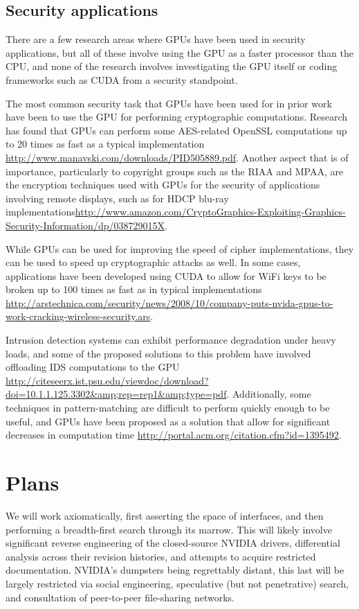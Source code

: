\documentclass[letterpaper,10pt]{article}
\begin{document}
\subsection{Security applications}
  There are a few research areas where GPUs have been used in security applications, but all of these involve using the GPU as a faster processor than the CPU, and none of the research involves investigating the GPU itself or coding frameworks such as CUDA from a security standpoint.
  
  The most common security task that GPUs have been used for in prior work have been to use the GPU for performing cryptographic computations. Research has found that GPUs can perform some AES-related OpenSSL computations up to 20 times as fast as a typical implementation
\url{http://www.manavski.com/downloads/PID505889.pdf}. Another aspect that is of importance, particularly to copyright groups such as the RIAA and MPAA, are the encryption techniques used with GPUs for the security of applications involving remote displays, such as for HDCP blu-ray implementations\url{http://www.amazon.com/CryptoGraphics-Exploiting-Graphics-Security-Information/dp/038729015X}.
  
  While GPUs can be used for improving the speed of cipher implementations, they can be used to speed up cryptographic attacks as well. In some cases, applications have been developed using CUDA to allow for WiFi keys to be broken up to 100 times as fast as in typical implementations \url{http://arstechnica.com/security/news/2008/10/company-puts-nvida-gpus-to-work-cracking-wireless-security.ars}.
  
  Intrusion detection systems can exhibit performance degradation under heavy
  loads, and some of the proposed solutions to this problem have involved
  offloading IDS computations to the GPU
  \url{http://citeseerx.ist.psu.edu/viewdoc/download?doi=10.1.1.125.3302&amp;rep=rep1&amp;type=pdf}.
  Additionally, some techniques in pattern-matching are difficult to perform
  quickly enough to be useful, and GPUs have been proposed as a solution that
  allow for significant decreases in computation time
  \url{http://portal.acm.org/citation.cfm?id=1395492}.


\section{Plans}

We will work axiomatically, first asserting the space of interfaces, and then
performing a breadth-first search through its marrow. This will likely involve
significant reverse engineering of the closed-source NVIDIA drivers, differential
analysis across their revision histories, and attempts to acquire restricted
documentation. NVIDIA's dumpsters being regrettably distant, this last will be
largely restricted via social engineering, speculative (but not penetrative)
search, and consultation of peer-to-peer file-sharing networks.
\end{document}
